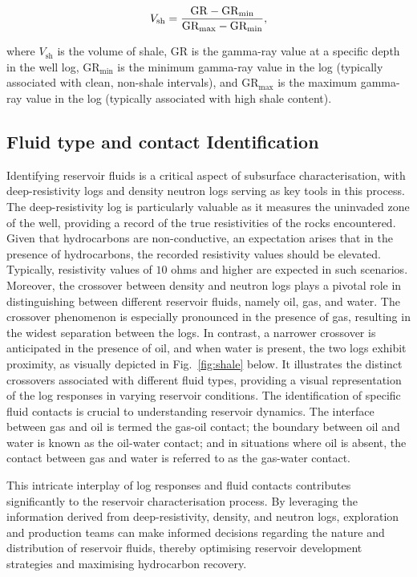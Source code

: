 \documentclass{gji}
\begin{document}
\begin{equation}\label{eq:sh}
    V_{\text{sh}} = {\rm \frac{GR-GR_{min}}{GR_{max} - GR_{min}}},
\end{equation}

\noindent where \( V_{\text{sh}}\) is the volume of shale,
 \( \text{GR} \) is the gamma-ray value at a specific depth in the well log, \( \text{GR}_{\text{min}} \) is the minimum gamma-ray value in the log (typically associated with clean, non-shale intervals), and \( \text{GR}_{\text{max}} \) is the maximum gamma-ray value in the log (typically associated with high shale content).

\subsection{Fluid type and contact Identification} \label{subsec:fluid}

Identifying reservoir fluids is a critical aspect of subsurface characterisation, with deep-resistivity logs and density neutron logs serving as key tools in this process.
The deep-resistivity log is particularly valuable as it measures the uninvaded zone of the well, providing a record of the true resistivities of the rocks encountered. Given that hydrocarbons are non-conductive, an expectation arises that in the presence of hydrocarbons, the recorded resistivity values should be elevated. 
Typically, resistivity values of $10$ ohms and higher are expected in such scenarios.
Moreover, the crossover between density and neutron logs plays a pivotal role in distinguishing between different reservoir fluids, namely oil, gas, and water.
The crossover phenomenon is especially pronounced in the presence of gas, resulting in the widest separation between the logs. 
In contrast, a narrower crossover is anticipated in the presence of oil, and when water is present, the two logs exhibit proximity, as visually depicted in Fig.~\ref{fig:shale} below.
It illustrates the distinct crossovers associated with different fluid types, providing a visual representation of the log responses in varying reservoir conditions.
The identification of specific fluid contacts is crucial to understanding reservoir dynamics.
The interface between gas and oil is termed the gas-oil contact; the boundary between oil and water is known as the oil-water contact; and in situations where oil is absent, the contact between gas and water is referred to as the gas-water contact.

This intricate interplay of log responses and fluid contacts contributes significantly to the reservoir characterisation process.
By leveraging the information derived from deep-resistivity, density, and neutron logs, exploration and production teams can make informed decisions regarding the nature and distribution of reservoir fluids, thereby optimising reservoir development strategies and maximising hydrocarbon recovery.
\end{document}
